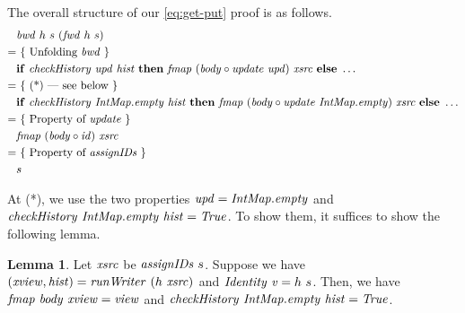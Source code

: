 \documentclass{article}
\theoremstyle{definition}
\newtheorem{lemma}{Lemma}
\begin{document}
The overall structure of our \ref{eq:get-put} proof is as follows. 
\begin{align*}
  & \mathit{bwd}~h~s~(\mathit{fwd}~h~s) \\
= & ~\{ \mbox{ Unfolding $\mathit{bwd}$ } \}\\
  & \mathbf{if}~ \mathit{checkHistory}~\mathit{upd}~\mathit{hist}~\mathbf{then}~ \mathit{fmap}~(\mathit{body} \circ \mathit{update}~\mathit{upd})~\mathit{xsrc}~\mathbf{else}~\dots \\
= & ~\{ 
    \mbox{ (*) --- see below }\}\\
  & \mathbf{if}~ \mathit{checkHistory}~\mathit{IntMap.empty}~\mathit{hist}~\mathbf{then}~ \mathit{fmap}~(\mathit{body} \circ \mathit{update}~\mathit{IntMap.empty})~\mathit{xsrc}~\mathbf{else}~\dots \\
= & ~\{ \mbox{ Property of $\mathit{update}$ } \}\\
  & \mathit{fmap}~(\mathit{body} \circ \mathit{id})~\mathit{xsrc}\\
= & ~\{ \mbox{ Property of $\mathit{assignIDs}$ } \}\\
  & s 
\end{align*}

At (*), we use the two properties
$\mathit{upd} = \mathit{IntMap.empty}$ and $\mathit{checkHistory}~\mathit{IntMap.empty}~\mathit{hist} = \mathit{True}$. To show them, it suffices to show the following lemma.
\begin{lemma}
Let $\mathit{xsrc}$ be $\mathit{assignIDs}~s$.
Suppose we have $(\mathit{xview},\mathit{hist}) = \mathit{runWriter}~(h~\mathit{xsrc})$ 
and $\mathit{Identity}~\mathit{v} = h~s$.
Then, we have $\mathit{fmap}~\mathit{body}~\mathit{xview} = \mathit{view}$ and 
$\mathit{checkHistory}~\mathit{IntMap.empty}~\mathit{hist} = \mathit{True}$.
\end{lemma}
\end{document}
